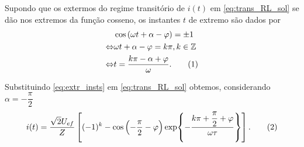\documentclass[a4paper, titlepage, portuguese]{article}
\newcommand{\eq}{\Leftrightarrow} %
\newcommand\numberthis{\addtocounter{equation}{1}\tag{\theequation}}
\begin{document}
	\subsubsection{}
	\par
	Supondo que os extermos do regime transitório de $i(t)$ em \eqref{eq:trans_RL_sol} se dão nos extremos da função cosseno, os instantes $t$ de extremo são dados por
	\begin{align*}
		&\cos\left(\omega t + \alpha - \varphi\right) = \pm 1 \\ \eq
		&\omega t + \alpha - \varphi = k\pi, k \in \mathbb{Z} \\ \eq
		&t = \dfrac{k\pi - \alpha + \varphi}{\omega}. \numberthis \label{eq:extr_insts}
	\end{align*}
	\par
	Substituindo \eqref{eq:extr_insts} em \eqref{eq:trans_RL_sol} obtemos, considerando $\alpha = -\dfrac{\pi}{2}$
	\begin{align*}
		i(t) = \dfrac{\sqrt{2}U_{ef}}{Z} \left[(-1)^k - \cos\left(-\dfrac{\pi}{2} - \varphi\right)\exp{-\dfrac{k\pi + \dfrac{\pi}{2} + \varphi}{\omega\tau}}\right].\numberthis \label{eq:extr}
	\end{align*}

\end{document}
